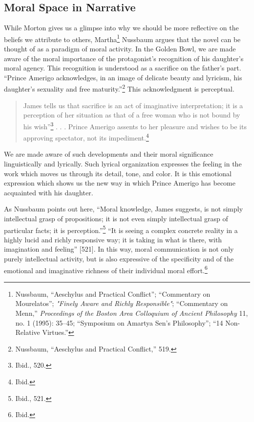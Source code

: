\documentclass[phdthesis,12pt,final]{wuthesis}
\theoremstyle{definition}
\theoremstyle{definition}
\theoremstyle{definition}
\theoremstyle{definition}
\theoremstyle{remark}
\begin{document}
\subsection*{Moral Space in Narrative}\label{moral-space-in-narrative}

While Morton gives us a glimpse into why we should be more reflective on the beliefs we attribute to others, Martha\footnote{Nussbaum, {``Aeschylus and Practical Conflict''}; {``Commentary on {Mourelatos}''}; \emph{"{Finely Aware} and {Richly Responsible}"}; {``Commentary on {Menn},''} \emph{Proceedings of the Boston Area Colloquium of Ancient Philosophy} 11, no. 1 (1995): 35--45; {``Symposium on {Amartya Sen}'s Philosophy''}; {``14 {Non-Relative Virtues}.''}} Nussbaum argues that the novel can be thought of as a paradigm of moral activity. In the Golden Bowl, we are made aware of the moral importance of the protagonist's recognition of his daughter's moral agency. This recognition is understood as a sacrifice on the father's part. ``Prince Amerigo acknowledges, in an image of delicate beauty and lyricism, his daughter's sexuality and free maturity.''\footnote{Nussbaum, {``Aeschylus and Practical Conflict,''} 519.} This acknowledgment is perceptual.

\begin{quote}
James tells us that sacrifice is an act of imaginative interpretation; it is a perception of her situation as that of a free woman who is not bound by his wish''\footnote{Ibid., 520.} . . . Prince Amerigo assents to her pleasure and wishes to be its approving spectator, not its impediment.\footnote{Ibid.}
\end{quote}

We are made aware of such developments and their moral significance linguistically and lyrically. Such lyrical organization expresses the feeling in the work which moves us through its detail, tone, and color. It is this emotional expression which shows us the new way in which Prince Amerigo has become acquainted with his daughter.

As Nussbaum points out here, ``Moral knowledge, James suggests, is not simply intellectual grasp of propositions; it is not even simply intellectual grasp of particular facts; it is perception.''\footnote{Ibid., 521.} ``It is seeing a complex concrete reality in a highly lucid and richly responsive way; it is taking in what is there, with imagination and feeling'' {[}521{]}. In this way, moral communication is not only purely intellectual activity, but is also expressive of the specificity and of the emotional and imaginative richness of their individual moral effort.\footnote{Ibid.}
\end{document}

